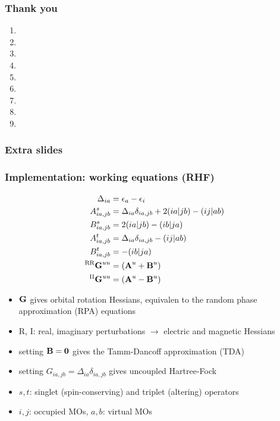 \documentclass{beamer}
\begin{document}
\begin{frame}
  \frametitle{Thank you}
  \scriptsize
  \begin{enumerate}
  \item {}
  \item {}
  \item {}
  \item {}
  \item {}
  \item {}
  \item {}
  \item {}
  \item {}
  \end{enumerate}
\end{frame}

\begin{frame}
  \frametitle{Extra slides}
\end{frame}

\begin{frame}
  \frametitle{Implementation: working equations (RHF)}
  \begin{align*}
    \Delta_{ia} &= \epsilon_{a} - \epsilon_{i} \\
    A_{ia,jb}^{s} &= \Delta_{ia}\delta_{ia,jb} + 2(ia|jb) - (ij|ab) \\
    B_{ia,jb}^{s} &= 2(ia|jb) - (ib|ja) \\
    A_{ia,jb}^{t} &= \Delta_{ia}\delta_{ia,jb} - (ij|ab) \\
    B_{ia,jb}^{t} &= - (ib|ja) \\
    ^{\text{RR}}\boldsymbol{\mathbf{G}}^{uu} &= (\boldsymbol{\mathbf{A}}^{u} + \boldsymbol{\mathbf{B}}^{u}) \\
    ^{\text{II}}\boldsymbol{\mathbf{G}}^{uu} &= (\boldsymbol{\mathbf{A}}^{u} - \boldsymbol{\mathbf{B}}^{u})
  \end{align*}
  \scriptsize
  \begin{itemize}
  \item \(\boldsymbol{\mathbf{G}}\) gives orbital rotation Hessians, equivalen to the random phase approximation (RPA) equations \\
  \item R, I: real, imaginary perturbations \(\rightarrow\) electric and magnetic Hessians \\
  \item setting \(\boldsymbol{\mathbf{B}} = \boldsymbol{\mathbf{0}}\) gives the Tamm-Dancoff approximation (TDA) \\
  \item setting \( G_{ia,jb} = \Delta_{ia}\delta_{ia,jb} \) gives uncoupled Hartree-Fock \\
  \item \(s,t\): singlet (spin-conserving) and triplet (altering) operators \\
  \item \(i,j\): occupied MOs, \(a,b\): virtual MOs
  \end{itemize}
\end{frame}
\end{document}
